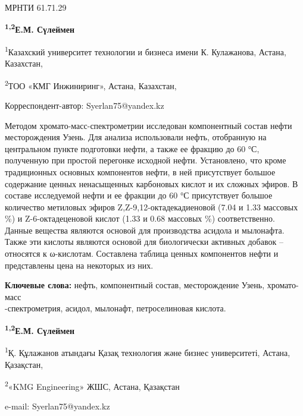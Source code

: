 \newpage
МРНТИ 61.71.29


\begin{center}
{\bfseries \textsuperscript{1,2}Е.М. Сүлеймен}

\textsuperscript{1}Казахский университет технологии и бизнеса имени К.
Кулажанова, Астана, Казахстан,

\textsuperscript{2}ТОО «КМГ Инжиниринг», Астана, Казахстан,
\end{center}

Корреспондент-автор: Syerlan75@yandex.kz

Методом хромато-масс-спектрометрии исследован компонентный состав нефти
месторождения Узень. Для анализа использовали нефть, отобранную на
центральном пункте подготовки нефти, а также ее фракцию до 60 °С,
полученную при простой перегонке исходной нефти. Установлено, что кроме
традиционных основных компонентов нефти, в ней присутствует большое
содержание ценных ненасыщенных карбоновых кислот и их сложных эфиров. В
составе исследуемой нефти и ее фракции до 60 °С присутствует большое
количество метиловых эфиров Z,Z-9,12-октадекадиеновой (7.04 и 1.33
массовых \%) и Z-6-октадеценовой кислот (1.33 и 0.68 массовых \%)
соответственно. Данные вещества являются основой для производства
асидола и мылонафта. Также эти кислоты являются основой для биологически
активных добавок -- относятся к ω-кислотам. Составлена таблица ценных
компонентов нефти и представлены цена на некоторых из них.

{\bfseries Ключевые слова:} нефть, компонентный состав, месторождение
Узень, хромато-масс\\-спектрометрия, асидол, мылонафт, петроселиновая
кислота.


\begin{center}
{\bfseries \textsuperscript{1,2}Е.М. Сүлеймен}

\textsuperscript{1}Қ. Құлажанов атындағы Қазақ технология және бизнес
университеті, Астана, Қазақстан,

\textsuperscript{2}«KMG Engineering» ЖШС, Астана, Қазақстан

e-mail: Syerlan75@yandex.kz
\end{center}

